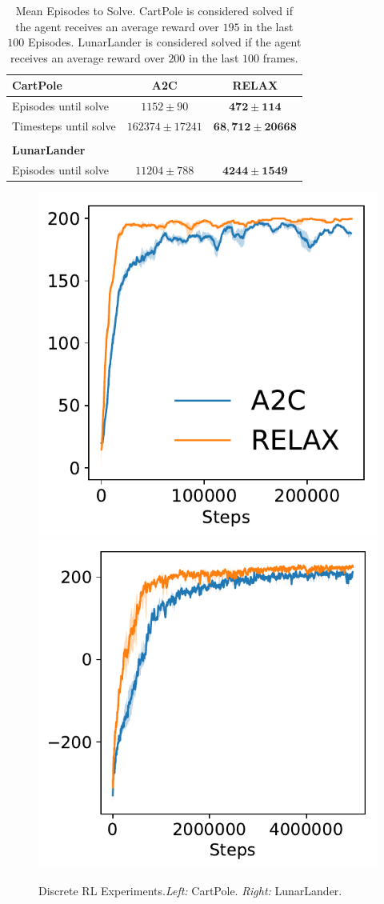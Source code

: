 \documentclass{article}
\begin{document}
\begin{table}[h]
\centering
\begin{tabular}{l c c} 
\textbf{CartPole} & A2C & RELAX \\\midrule
Episodes until solve      & $1152 \pm 90$ & $\bm{472 \pm 114}$ \\
Timesteps until solve    & $162374 \pm 17241$ & $\bm{68,712 \pm 20668}$ \\\\
\textbf{LunarLander}\\ \midrule
Episodes until solve & $11204 \pm 788$ & $\bm{4244 \pm 1549}$ 
\end{tabular}
\caption{Mean Episodes to Solve. CartPole is considered solved if the agent receives an average reward over $195$ in the last $100$ Episodes. LunarLander is considered solved if the agent receives an average reward over $200$ in the last $100$ frames.}
\label{tab:vae}
\end{table}

\begin{figure}[h]
\centering
\includegraphics[width=.4\textwidth]{figures/cp_paper}
\includegraphics[width=.4\textwidth]{figures/ll_paper}
\caption{Discrete RL Experiments.\emph{Left:} CartPole.
\emph{Right:} LunarLander.}
\label{fig:disc_rl}
\end{figure}
\end{document}
